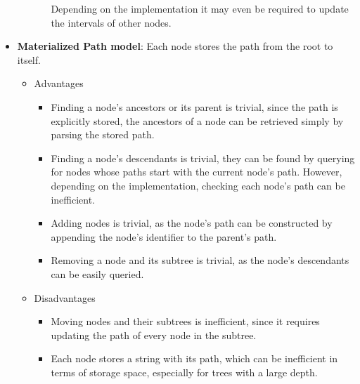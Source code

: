 \begin{itemize}[nolistsep]
\begin{itemize}
\begin{itemize}
			                  Depending on the implementation it may even be required to update the intervals of
			                  other nodes.
		            \end{itemize}
	      \end{itemize}
	\item \textbf{Materialized Path model}: Each node stores the path from the root to itself.
	      \begin{itemize}
		      \item Advantages
		            \begin{itemize}
			            \item Finding a node’s ancestors or its parent is trivial, since the path is explicitly stored,
			                  the ancestors of a node can be retrieved simply by parsing the stored path.
			            \item Finding a node’s descendants is trivial, they can be found by
			                  querying for nodes whose paths start with the current node's path.
                        However, depending on the implementation, checking each node's path can be inefficient.
			            \item Adding nodes is trivial, as the node's path can be constructed by appending
			                  the node's identifier to the parent's path.
			            \item Removing a node and its subtree is trivial, as the node's descendants can be
			                  easily queried.
		            \end{itemize}
		      \item Disadvantages
		            \begin{itemize}
			            \item Moving nodes and their subtrees is inefficient, since it requires updating
			                  the path of every node in the subtree.
			            \item Each node stores a string with its path, which can be inefficient in terms of
			                  storage space, especially for trees with a large depth.
		            \end{itemize}
	      \end{itemize}
\end{itemize}


